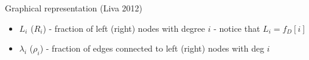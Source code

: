 \begin{frame}{Graphical representation (Liva 2012)}
\pause
\begin{block}{}
\begin{itemize}
\item $L_i$ ($R_i$) - fraction of left (right) nodes with degree $i$ - notice that $\boxed{L_i = f_D[i]}$
\item $\lambda_i$ ($\rho_i$) - fraction of edges connected to left (right) nodes with deg $i$
\end{itemize}
\end{block}
\end{frame}
